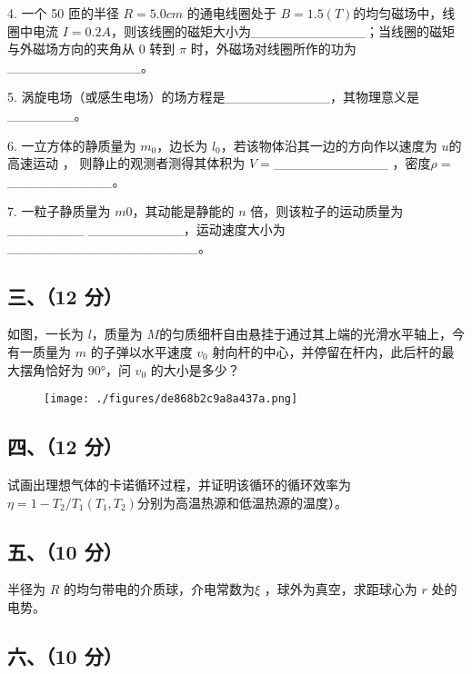 4. 一个 50 匝的半径 $R=5.0cm$ 的通电线圈处于 $B=1.5(T)$的均匀磁场中，线圈中电流 $I=0.2A$，则该线圈的磁矩大小为____________；当线圈的磁矩与外磁场方向的夹角从 0 转到 $\pi$ 时，外磁场对线圈所作的功为______________。

5. 涡旋电场（或感生电场）的场方程是___________，其物理意义是_______。

6. 一立方体的静质量为 $m_0$，边长为 $l_0$，若该物体沿其一边的方向作以速度为 $u$的高速运动 ， 则静止的观测者测得其体积为 $V=$____________ ，密度$\rho=$___________。

7. 一粒子静质量为 $m0$，其动能是静能的 $n$ 倍，则该粒子的运动质量为________
__________，运动速度大小为____________________。
\subsection{三、（12 分）}
如图，一长为 $l$，质量为 $M $的匀质细杆自由悬挂于通过其上端的光滑水平轴上，今有一质量为 $m$ 的子弹以水平速度 $v_0$ 射向杆的中心，并停留在杆内，此后杆的最大摆角恰好为 90°，问 $v_0$ 的大小是多少？
\begin{figure}[ht]
\centering
\texttt{[image: ./figures/de868b2c9a8a437a.png]}
\caption{} \label{fig_NJUB07_2}
\end{figure}
\subsection{四、（12 分）}
试画出理想气体的卡诺循环过程，并证明该循环的循环效率为$\eta=1-T_2/T_1 (T_1,T_2) $分别为高温热源和低温热源的温度）。
\subsection{五、（10 分）}
半径为 $R$ 的均匀带电的介质球，介电常数为$\xi$ ，球外为真空，求距球心为 $r$ 处的电势。
\subsection{六、（10 分）}